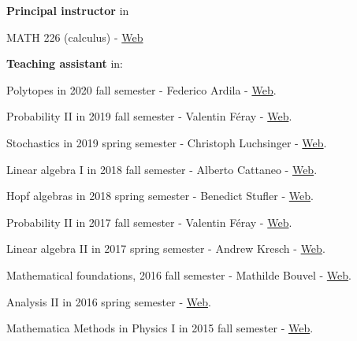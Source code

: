 \documentclass[margin, 10pt]{res} %
\begin{document}
\begin{resume}
\textbf{Principal instructor} in 

MATH 226 (calculus) - \href{http://bulletin.sfsu.edu/courses/math/}{Web}

\textbf{Teaching assistant} in:

Polytopes in 2020 fall semester - Federico Ardila - \href{http://bulletin.sfsu.edu/courses/math/}{Web}.
\vspace{-.5cm}

Probability II in 2019 fall semester - Valentin Féray - \href{https://www.math.uzh.ch/index.php?id=1402&key1=0&key2=3662&key3=282&semId=39&L=1}{Web}.
\vspace{-.5cm}

Stochastics in 2019 spring semester - Christoph Luchsinger - \href{https://www.math.uzh.ch/index.php?id=ve_vo_det&key1=0&key2=3448&semId=38}{Web}.
\vspace{-.5cm}

Linear algebra I in 2018 fall semester - Alberto Cattaneo - \href{https://www.math.uzh.ch/index.php?id=ve_vo_det&key2=3314&keySemId=37}{Web}.
\vspace{-.5cm}

Hopf algebras in 2018 spring semester - Benedict Stufler - \href{https://www.math.uzh.ch/index.php?id=ve_vo_det&key1=0&key2=3270&key3=564&semId=36&L=1}{Web}.
\vspace{-.5cm}

Probability II in 2017 fall semester - Valentin Féray - \href{https://www.math.uzh.ch/index.php?id=ve_vo_det&id=ve_vo_det&key1=0&key2=3059&key3=282&semId=35&L=1}{Web}.
\vspace{-.5cm}

Linear algebra II in 2017 spring semester - Andrew Kresch - \href{https://www.math.uzh.ch/index.php?id=ve_vo_det&id=ve_vo_det&key1=0&key2=2924&key3=468&semId=34&L=1}{Web}.
\vspace{-.5cm}

Mathematical foundations, 2016 fall semester - Mathilde Bouvel - \href{https://www.math.uzh.ch/index.php?id=ve_vo_det&id=ve_vo_det&key1=0&key2=2755&key3=234&semId=33&L=1}{Web}.
\vspace{-.5cm}

Analysis II in 2016 spring semester - \href{https://www2.math.ethz.ch/education/bachelor/lectures/fs2016/math/analysis2.html}{Web}.
\vspace{-.5cm}

Mathematica Methods in Physics I in 2015 fall semester - \href{https://www2.math.ethz.ch/education/bachelor/lectures/hs2015/math/mmp1.html}{Web}.



\end{resume}
\end{document}
